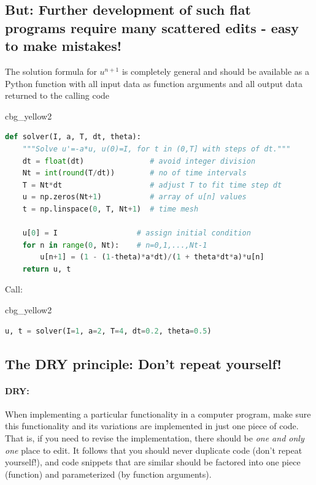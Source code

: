 \documentclass[%
oneside,                 %
final,                   %
10pt]{article}
\newenvironment{_cod_tight}[1]{
   \def\FrameCommand{\colorbox{#1}}
   \FrameRule0.6pt\MakeFramed {\FrameRestore}\vskip3mm}
   {\vskip0mm\endMakeFramed}
\newenvironment{cod}[1]{
\bgroup\rmfamily
\fboxsep=0mm\relax
\begin{_cod_tight}{#1}
\list{}{\parsep=-2mm\parskip=0mm\topsep=0pt\leftmargin=2mm
\rightmargin=2\leftmargin\leftmargin=4pt\relax}
\item\relax}
{\endlist\end{_cod_tight}\egroup}
\begin{document}
\subsection*{But: Further development of such flat programs require many scattered edits - easy to make mistakes!}


\begin{center}
\begin{Sbox}
\begin{minipage}{0.85\linewidth}
The solution formula for $u^{n+1}$ is completely general and
should be available as a Python function with all input data as
function arguments and all output data returned to the calling code
\end{minipage}
\end{Sbox}
\fbox{\TheSbox}
\end{center}

\begin{cod}{cbg_yellow2}\begin{lstlisting}[language=Python,style=simple,xleftmargin=2mm]
def solver(I, a, T, dt, theta):
    """Solve u'=-a*u, u(0)=I, for t in (0,T] with steps of dt."""
    dt = float(dt)               # avoid integer division
    Nt = int(round(T/dt))        # no of time intervals
    T = Nt*dt                    # adjust T to fit time step dt
    u = np.zeros(Nt+1)           # array of u[n] values
    t = np.linspace(0, T, Nt+1)  # time mesh

    u[0] = I                  # assign initial condition
    for n in range(0, Nt):    # n=0,1,...,Nt-1
        u[n+1] = (1 - (1-theta)*a*dt)/(1 + theta*dt*a)*u[n]
    return u, t
\end{lstlisting}\end{cod}
\noindent

Call:

\begin{cod}{cbg_yellow2}\begin{lstlisting}[language=Python,style=simple,xleftmargin=2mm]
u, t = solver(I=1, a=2, T=4, dt=0.2, theta=0.5)
\end{lstlisting}\end{cod}
\noindent

\subsection*{The DRY principle: Don't repeat yourself!}


\paragraph{DRY:}
When implementing a particular functionality in a computer program, make sure
this functionality and its variations are implemented in just one piece
of code. That is, if you need to revise the implementation, there should be
\emph{one and only one} place to edit. It follows that you should never
duplicate code (don't repeat yourself!), and code snippets that are
similar should be factored into one piece (function) and parameterized (by
function arguments).
\end{document}
